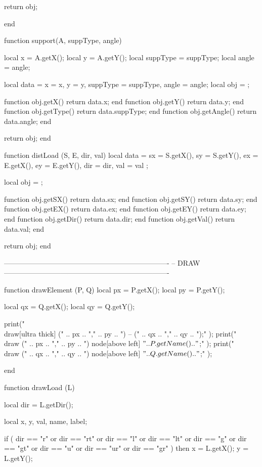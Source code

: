 \begin{luacode}
	return obj;
	
end


function support(A, suppType, angle)

	local x = A.getX();
	local y = A.getY();
	local suppType = suppType;
	local angle = angle;
	
	local data = {x = x, y = y, suppType = suppType, angle = angle};
	local obj = {};
	
	function obj.getX() return data.x; end
	function obj.getY() return data.y; end
	function obj.getType() return data.suppType; end
	function obj.getAngle() return data.angle; end
	
	return obj;
end


function distLoad (S, E, dir, val)
	local data ={	sx = S.getX(),
					sy = S.getY(),
					ex = E.getX(),
					ey = E.getY(),
					dir = dir,
					val = val
				};
				
	local obj = {};
	
	function obj.getSX() return data.sx; end
	function obj.getSY() return data.sy; end
	function obj.getEX() return data.ex; end
	function obj.getEY() return data.ey; end
	function obj.getDir() return data.dir; end
	function obj.getVal() return data.val; end
	
	return obj;
end

----------------------------------------------------------------------
-- DRAW
----------------------------------------------------------------------


function drawElement (P, Q)
	local px = P.getX();
	local py = P.getY();
	
	local qx = Q.getX(); 
	local qy = Q.getY();
	
	print("\\draw[ultra thick] (" .. px .. "," .. py .. ") -- (" .. qx .. "," .. qy .. ");" );
	print("\\draw (" .. px .. "," .. py .. ") node[above left] {$" .. P.getName().. "$};" );
	print("\\draw (" .. qx .. "," .. qy .. ") node[above left] {$" .. Q.getName().. "$};" );

end

function drawLoad (L)

	local dir = L.getDir();
	
	local x, y, val, name, label;
	
	if ( dir == "r" or dir == "rt" or dir == "l" or dir == "lt" or dir == "g" or dir == "gt" or dir == "u" or dir == "ur" or dir == "gr" ) then
		x = L.getX();
		y = L.getY();
		

\end{luacode}
